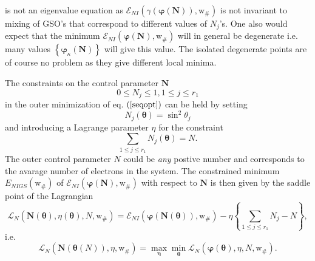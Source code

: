 \documentclass[aps,preprint]{revtex4}%
\begin{document}
is not an eigenvalue equation as $\mathcal{E}_{NI}\left(  \gamma\left(
\mathbf{\varphi}\left(  \mathbf{N}\right)  \right)  \mathbf{,}\mathrm{w}%
_{\#}\right)  $ is not invariant to mixing of GSO's that correspond to
different values of $N_{j}$'s. One also would expect that the minimum
$\mathcal{E}_{NI}\left(  \mathbf{\varphi}\left(  \mathbf{N}\right)
\mathbf{,}\mathrm{w}_{\#}\right)  $ will in general be degenerate i.e. many
values $\left\{  \mathbf{\varphi}_{\kappa}\left(  \mathbf{N}\right)  \right\}
$ will give this value. The isolated degenerate points are of course no
problem as they give different local minima.

The constraints on the control parameter $\mathbf{N}$
\begin{equation}
0\leq N_{j}\leq1,1\leq j\leq r_{1}%
\end{equation}
in the outer minimization of eq. $\left(  \ref{seqopt}\right)  $ can be held
by setting
\begin{equation}
N_{j}\left(  \mathbf{\theta}\right)  =\sin^{2}\theta_{j}%
\end{equation}
and introducing a Lagrange parameter $\eta$ for the constraint
\begin{equation}
\sum_{1\leq j\leq r_{1}}N_{j}\left(  \mathbf{\theta}\right)  =N.
\end{equation}
The outer control parameter $N$ could be \emph{any }postive number and
corresponds to the avarage number of electrons in the system. The constrained
minimum $E_{NIGS}\left(  \mathrm{w}_{\#}\right)  $ of $\mathcal{E}_{NI}\left(
\mathbf{\varphi}\left(  \mathbf{N}\right)  \mathbf{,}\mathrm{w}_{\#}\right)  $
with respect to $\mathbf{N}$ is then given by the saddle point of the
Lagrangian
\begin{equation}
\mathcal{L}_{N}\left(  \mathbf{N}\left(  \mathbf{\theta}\right)  ,\eta\left(
\mathbf{\theta}\right)  \mathbf{,}N\mathbf{,}\mathrm{w}_{\#}\right)
=\mathcal{E}_{NI}\left(  \mathbf{\varphi}\left(  \mathbf{N}\left(
\mathbf{\theta}\right)  \right)  \mathbf{,}\mathrm{w}_{\#}\right)
-\eta\left\{  \sum_{1\leq j\leq r_{1}}N_{j}-N\right\}  ,
\end{equation}
i.e.
\begin{equation}
\mathcal{L}_{N}\left(  \mathbf{N}\left(  \mathbf{\theta}\left(  N\right)
\right)  ,\eta\mathbf{,}\mathrm{w}_{\#}\right)  =\max_{\mathbf{\eta}}%
\min_{\mathbf{\theta}}\mathcal{L}_{N}\left(  \mathbf{\varphi}\left(
\mathbf{\theta}\right)  ,\eta\mathbf{,}N\mathbf{,}\mathrm{w}_{\#}\right)  .
\end{equation}
\end{document}
